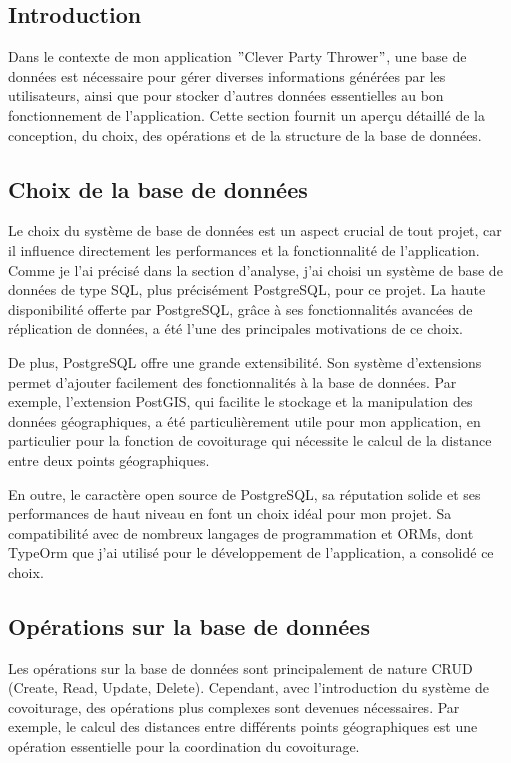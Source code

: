 \subsection{Introduction}\label{subsec:introduction_base_de_donnee}
Dans le contexte de mon application \("\)Clever Party Thrower\("\), une base de données est nécessaire pour gérer diverses informations générées par les utilisateurs,
ainsi que pour stocker d'autres données essentielles au bon fonctionnement de l'application.
Cette section fournit un aperçu détaillé de la conception, du choix, des opérations et de la structure de la base de données.

\subsection{Choix de la base de données}\label{subsec:choix-de-la-base-de-donnee}
Le choix du système de base de données est un aspect crucial de tout projet, car il influence directement les performances et la fonctionnalité de l'application.
Comme je l'ai précisé dans la section d'analyse, j'ai choisi un système de base de données de type SQL, plus précisément PostgreSQL, pour ce projet.
La haute disponibilité offerte par PostgreSQL, grâce à ses fonctionnalités avancées de réplication de données, a été l'une des principales motivations de ce choix.

De plus, PostgreSQL offre une grande extensibilité.
Son système d'extensions permet d'ajouter facilement des fonctionnalités à la base de données.
Par exemple, l'extension PostGIS, qui facilite le stockage et la manipulation des données géographiques, a été particulièrement utile pour mon application,
en particulier pour la fonction de covoiturage qui nécessite le calcul de la distance entre deux points géographiques.

En outre, le caractère open source de PostgreSQL, sa réputation solide et ses performances de haut niveau en font un choix idéal pour mon projet.
Sa compatibilité avec de nombreux langages de programmation et ORMs, dont TypeOrm que j'ai utilisé pour le développement de l'application, a consolidé ce choix.

\subsection{Opérations sur la base de données}\label{subsec:operation-sur-la-base-de-donnees}
Les opérations sur la base de données sont principalement de nature CRUD (Create, Read, Update, Delete).
Cependant, avec l'introduction du système de covoiturage, des opérations plus complexes sont devenues nécessaires.
Par exemple, le calcul des distances entre différents points géographiques est une opération essentielle pour la coordination du covoiturage.

